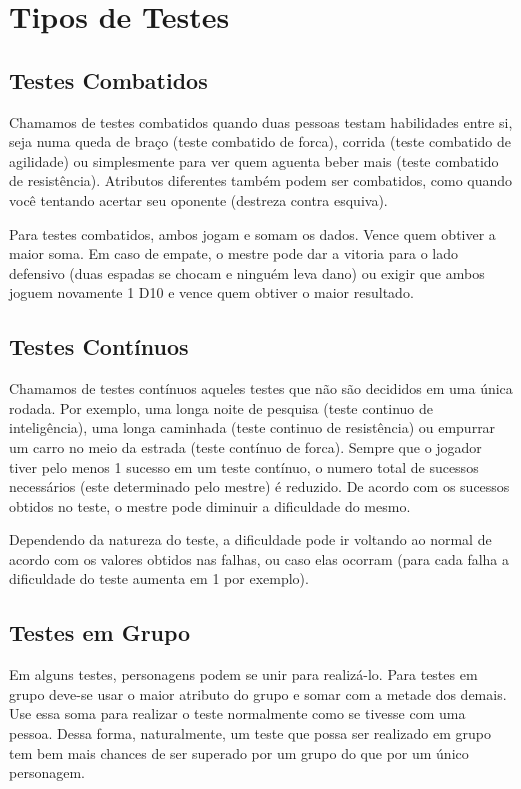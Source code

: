 \section{Tipos de Testes}

\subsection{Testes Combatidos}

Chamamos de testes combatidos quando duas pessoas testam habilidades entre si, seja numa queda de braço (teste combatido de forca), corrida (teste combatido de agilidade) ou simplesmente para ver quem aguenta beber mais (teste combatido de resistência). Atributos diferentes também podem ser combatidos, como quando você tentando acertar seu oponente (destreza contra esquiva).

Para testes combatidos, ambos jogam e somam os dados. Vence quem obtiver a maior soma. Em caso de empate, o mestre pode dar a vitoria para o lado defensivo (duas espadas se chocam e ninguém leva dano) ou exigir que ambos joguem novamente 1 D10 e vence quem obtiver o maior resultado.
\subsection{Testes Contínuos}

Chamamos de testes contínuos aqueles testes que não são decididos em uma única rodada. Por exemplo, uma longa noite de pesquisa (teste continuo de inteligência), uma longa caminhada (teste continuo de resistência) ou empurrar um carro no meio da estrada (teste contínuo de forca).
Sempre que o jogador tiver pelo menos 1 sucesso em um teste contínuo, o numero total de sucessos necessários (este determinado pelo mestre)  é reduzido.  De acordo com os sucessos obtidos no teste, o mestre pode diminuir a dificuldade do mesmo.

Dependendo da natureza do teste, a dificuldade pode ir voltando ao normal de acordo com os valores obtidos nas falhas, ou caso elas ocorram (para cada falha a dificuldade do teste aumenta em 1 por exemplo).
\subsection{Testes em Grupo}

Em alguns testes, personagens podem se unir para realizá-lo. Para testes em grupo deve-se usar o maior atributo do grupo e somar com a metade dos demais. Use essa soma para realizar o teste normalmente como se tivesse com uma pessoa. Dessa forma, naturalmente, um teste que possa ser realizado em grupo tem bem mais chances de ser superado por um grupo do que por um único personagem.


